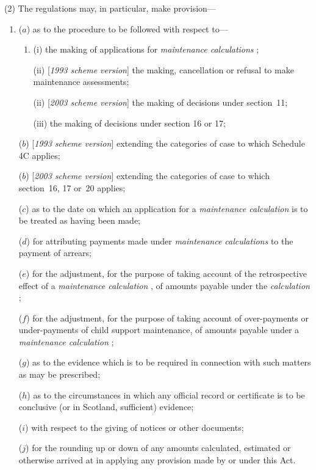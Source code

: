 \documentclass[12pt,a4paper]{article}
\begin{document}
(2) The regulations may, in particular, make provision—
\begin{enumerate}\item[]
($a$) as to the procedure to be followed with respect to—
\begin{enumerate}\item[]
(i) the making of applications for 
\emph{maintenance calculations}%
;

(ii) [\emph{1993 scheme version}] the making, cancellation or refusal to make maintenance assessments;

(ii) [\emph{2003 scheme version}] the making of decisions under section~11;


(iii) the making of decisions under section 16 or 17;
\end{enumerate}

($b$) [\emph{1993 scheme version}] extending the categories of case to which 
Schedule 4C  %
applies;

($b$) [\emph{2003 scheme version}] extending the categories of case to which section~16, 17 or~20 applies;

($c$) as to the date on which an application for a 
\emph{maintenance calculation}  %
is to be treated as having been made;

($d$) for attributing payments made under 
\emph{maintenance calculations}  %
to the payment of arrears;

($e$) for the adjustment, for the purpose of taking account of the retrospective effect of a 
\emph{maintenance calculation}%
, of amounts payable under the 
\emph{calculation}%
;

($f$) for the adjustment, for the purpose of taking account of over-payments or under-payments of child support maintenance, of amounts payable under a 
\emph{maintenance calculation}%
;

($g$) as to the evidence which is to be required in connection with such matters as may be prescribed;

($h$) as to the circumstances in which any official record or certificate is to be conclusive (or in Scotland, sufficient) evidence;

($i$) with respect to the giving of notices or other documents;

($j$) for the rounding up or down of any amounts calculated, estimated or otherwise arrived at in applying any provision made by or under this Act.
\end{enumerate}
\end{document}
